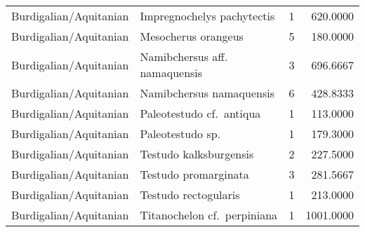 \begin{longtable}[]{@{}llrr@{}}
	Burdigalian/Aquitanian & Impregnochelys pachytectis & 1 &
	620.0000\tabularnewline
	Burdigalian/Aquitanian & Mesocherus orangeus & 5 &
	180.0000\tabularnewline
	Burdigalian/Aquitanian & Namibchersus aff. namaquensis & 3 &
	696.6667\tabularnewline
	Burdigalian/Aquitanian & Namibchersus namaquensis & 6 &
	428.8333\tabularnewline
	Burdigalian/Aquitanian & Paleotestudo cf.~antiqua & 1 &
	113.0000\tabularnewline
	Burdigalian/Aquitanian & Paleotestudo sp. & 1 & 179.3000\tabularnewline
	Burdigalian/Aquitanian & Testudo kalksburgensis & 2 &
	227.5000\tabularnewline
	Burdigalian/Aquitanian & Testudo promarginata & 3 &
	281.5667\tabularnewline
	Burdigalian/Aquitanian & Testudo rectogularis & 1 &
	213.0000\tabularnewline
	Burdigalian/Aquitanian & Titanochelon cf.~perpiniana & 1 &
	1001.0000\tabularnewline
	\bottomrule
\end{longtable}

